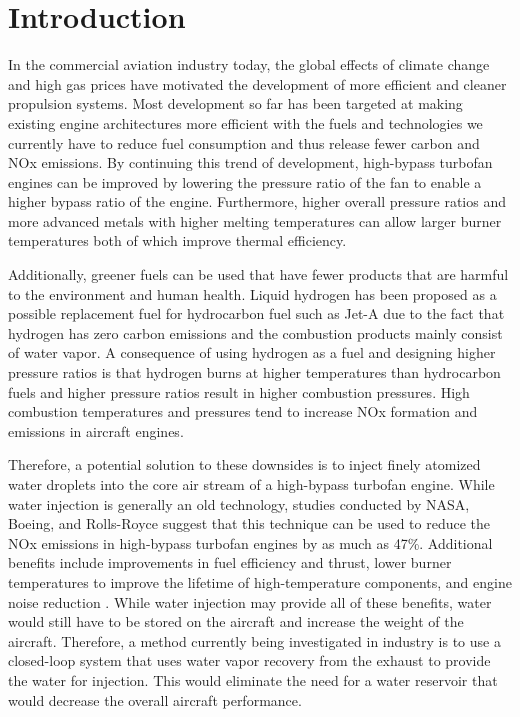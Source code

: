 \documentclass[]{icas2022}
\affil[1]{MSE Student, Department of Aerospace Engineering, University of Michigan}
\affil[2]{Ph.D.~Candidate, Department of Aerospace Engineering, University of Michigan}
\affil[3]{Professor, Department of Aerospace Engineering, University of Michigan}
\begin{document}
\body  %

\section{Introduction}
In the commercial aviation industry today, the global effects of climate change and high gas prices have motivated the development of more efficient and cleaner propulsion systems. Most development so far has been targeted at making existing engine architectures more efficient with the fuels and technologies we currently have to reduce fuel consumption and thus release fewer carbon and NOx emissions. By continuing this trend of development, high-bypass turbofan engines can be improved by lowering the pressure ratio of the fan to enable a higher bypass ratio of the engine. Furthermore, higher overall pressure ratios and more advanced metals with higher melting temperatures can allow larger burner temperatures both of which improve thermal efficiency. 

Additionally, greener fuels can be used that have fewer products that are harmful to the environment and human health. Liquid hydrogen has been proposed as a possible replacement fuel for hydrocarbon fuel such as Jet-A due to the fact that hydrogen has zero carbon emissions and the combustion products mainly consist of water vapor. A consequence of using hydrogen as a fuel and designing higher pressure ratios is that hydrogen burns at higher temperatures than hydrocarbon fuels and higher pressure ratios result in higher combustion pressures. High combustion temperatures and pressures tend to increase NOx formation and emissions in aircraft engines.

Therefore, a potential solution to these downsides is to inject finely atomized water droplets into the core air stream of a high-bypass turbofan engine. While water injection is generally an old technology, studies conducted by NASA, Boeing, and Rolls-Royce suggest that this technique can be used to reduce the NOx emissions in high-bypass turbofan engines by as much as 47\%. Additional benefits include improvements in fuel efficiency and thrust, lower burner temperatures to improve the lifetime of high-temperature components, and engine noise reduction \cite{nasa_inject}. While water injection may provide all of these benefits, water would still have to be stored on the aircraft and increase the weight of the aircraft. Therefore, a method currently being investigated in industry is to use a closed-loop system that uses water vapor recovery from the exhaust to provide the water for injection. This would eliminate the need for a water reservoir that would decrease the overall aircraft performance.
\end{document}
